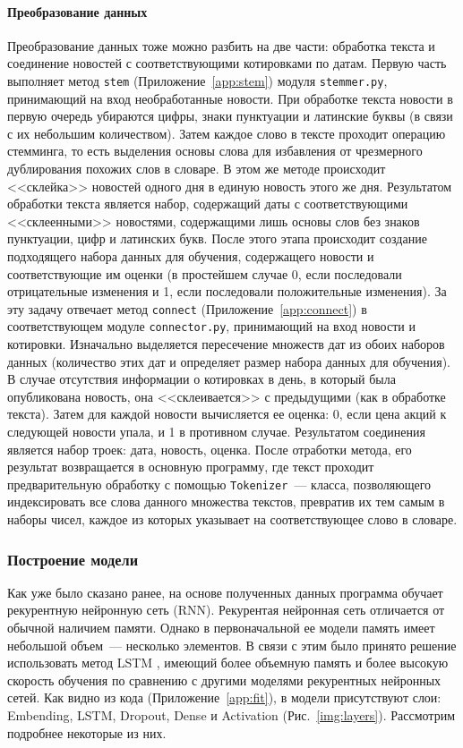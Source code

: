\documentclass[14pt]{matmex-diploma-custom}
\begin{document}
\paragraph{Преобразование данных}

Преобразование данных тоже можно разбить на две части: обработка текста и соединение новостей с соответствующими котировками по датам. Первую часть выполняет метод \texttt{stem} (Приложение~\ref{app:stem}) модуля \texttt{stemmer.py}, принимающий на вход необработанные новости. При обработке текста новости в первую очередь убираются цифры, знаки пунктуации и латинские буквы (в связи с их небольшим количеством). Затем каждое слово в тексте проходит операцию стемминга, то есть выделения основы слова для избавления от чрезмерного дублирования похожих слов в словаре. В этом же методе происходит <<склейка>> новостей одного дня в единую новость этого же дня. Результатом обработки текста является набор, содержащий даты с соответствующими <<склеенными>> новостями, содержащими лишь основы слов без знаков пунктуации, цифр и латинских букв. После этого этапа происходит создание подходящего набора данных для обучения, содержащего новости и соответствующие им оценки (в простейшем случае 0, если последовали отрицательные изменения и 1, если последовали положительные изменения). За эту задачу отвечает метод \texttt{connect} (Приложение~\ref{app:connect}) в соответствующем модуле \texttt{connector.py}, принимающий на вход новости и котировки. Изначально выделяется пересечение множеств дат из обоих наборов данных (количество этих дат и определяет размер набора данных для обучения). В случае отсутствия информации о котировках в день, в который была опубликована новость, она <<склеивается>> с предыдущими (как в обработке текста). Затем для каждой новости вычисляется ее оценка: 0, если цена акций к следующей новости упала, и 1 в противном случае. Результатом соединения является набор троек: дата, новость, оценка. После отработки метода, его результат возвращается в основную программу, где текст проходит предварительную обработку с помощью \texttt{Tokenizer}~--- класса, позволяющего индексировать все слова данного множества текстов, превратив их тем самым в наборы чисел, каждое из которых указывает на соответствующее слово в словаре.

\subsubsection{Построение модели}

Как уже было сказано ранее, на основе полученных данных программа обучает рекурентную нейронную сеть (RNN). Рекурентая нейронная сеть отличается от обычной наличием памяти. Однако в первоначальной ее модели память имеет небольшой объем~--- несколько элементов. В связи с этим было принято решение использовать метод LSTM \cite{tools:lstm}, имеющий более объемную память и более высокую скорость обучения по сравнению с другими моделями рекурентных нейронных сетей. Как видно из кода (Приложение~\ref{app:fit}), в модели присутствуют слои: Embending, LSTM, Dropout, Dense и Activation (Рис.~\ref{img:layers}). Рассмотрим подробнее некоторые из них.
\end{document}

